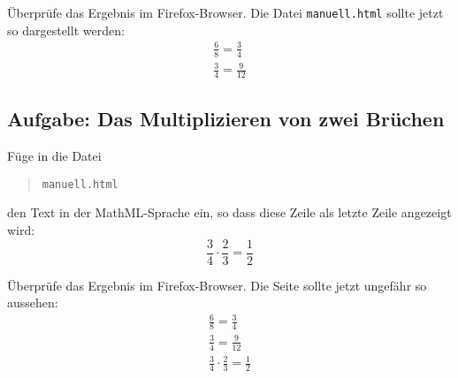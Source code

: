 Überprüfe das Ergebnis im Firefox-Browser. Die Datei \texttt{manuell.html} sollte jetzt so dargestellt werden:
\begin{align*}
& \frac{6}{8} = \frac{3}{4} & \\[2ex]
& \frac{3}{4} = \frac{9}{12} &
\end{align*}

\subsection*{Aufgabe: Das Multiplizieren von zwei Brüchen}

Füge in die Datei 
\begin{quote}
	\texttt{manuell.html}
\end{quote}
den Text in der MathML-Sprache ein, so dass diese Zeile als letzte Zeile angezeigt wird:
\[
\frac{3}{4} \cdot \frac{2}{3} = \frac{1}{2}
\]

Überprüfe das Ergebnis im Firefox-Browser. Die Seite sollte jetzt ungefähr so aussehen:
\begin{align*}
& \frac{6}{8} = \frac{3}{4} & \\[2ex]
& \frac{3}{4} = \frac{9}{12} & \\[2ex]
& \frac{3}{4} \cdot \frac{2}{3} = \frac{1}{2} & 
\end{align*}



